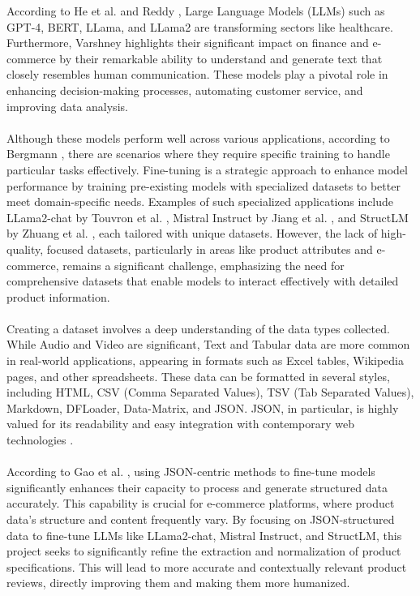 According to He et al. \cite{he2023survey} and Reddy \cite{REDDY2023101304}, Large Language Models (LLMs) such as GPT-4, BERT, LLama, and LLama2 are transforming sectors like healthcare. Furthermore, Varshney \cite{Varshney_2024} highlights their significant impact on finance and e-commerce by their remarkable ability to understand and generate text that closely resembles human communication. These models play a pivotal role in enhancing decision-making processes, automating customer service, and improving data analysis.
\\\\
Although these models perform well across various applications, according to Bergmann \cite{Bergmann_2024}, there are scenarios where they require specific training to handle particular tasks effectively. Fine-tuning is a strategic approach to enhance model performance by training pre-existing models with specialized datasets to better meet domain-specific needs. Examples of such specialized applications include LLama2-chat by Touvron et al. \cite{touvron2023llama}, Mistral Instruct by Jiang et al. \cite{jiang2023mistral}, and StructLM by Zhuang et al. \cite{zhuang2024structlm}, each tailored with unique datasets. However, the lack of high-quality, focused datasets, particularly in areas like product attributes and e-commerce, remains a significant challenge, emphasizing the need for comprehensive datasets that enable models to interact effectively with detailed product information.
\\\\
Creating a dataset involves a deep understanding of the data types collected. While Audio and Video are significant, Text and Tabular data are more common in real-world applications, appearing in formats such as Excel tables, Wikipedia pages, and other spreadsheets. These data can be formatted in several styles, including HTML, CSV (Comma Separated Values), TSV (Tab Separated Values), Markdown, DFLoader, Data-Matrix, and JSON. JSON, in particular, is highly valued for its readability and easy integration with contemporary web technologies \cite{singha2023tabular}.
\\\\
According to Gao et al. \cite{gao2024jsontuning}, using JSON-centric methods to fine-tune models significantly enhances their capacity to process and generate structured data accurately. This capability is crucial for e-commerce platforms, where product data's structure and content frequently vary. By focusing on JSON-structured data to fine-tune LLMs like LLama2-chat, Mistral Instruct, and StructLM, this project seeks to significantly refine the extraction and normalization of product specifications. This will lead to more accurate and contextually relevant product reviews, directly improving them and making them more humanized.
